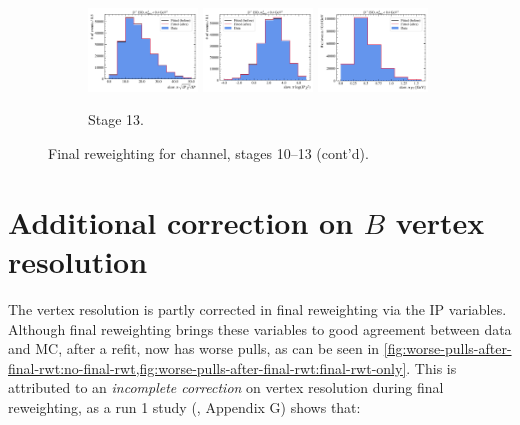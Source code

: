 \begin{figure}[htb]
    \begin{subfigure}{\textwidth}
        \centering
        \includegraphics[width=0.32\textwidth]{./figs-mc-correction/reweighting-final/plot_step12-Dst_iso-spi_comp.pdf}
        \includegraphics[width=0.32\textwidth]{./figs-mc-correction/reweighting-final/plot_step12-Dst_iso-spi_log_ip_chi2.pdf}
        \includegraphics[width=0.32\textwidth]{./figs-mc-correction/reweighting-final/plot_step12-Dst_iso-spi_pt.pdf}
        \caption{Stage 13.}
    \end{subfigure}

    \caption{Final reweighting for \Dstar channel, stages 10--13 (cont'd).}
    \label{fig:final-rwt-dst-idx3}
\end{figure}


\section{Additional correction on $B$ vertex resolution}
\label{ref:mc-cor:vertex}

The \B vertex resolution is partly corrected in final reweighting via the IP
variables.
Although final reweighting brings these variables to good agreement
between data and MC, after a refit, \mmSq now has worse pulls, as can be seen
in \cref{fig:worse-pulls-after-final-rwt:no-final-rwt,fig:worse-pulls-after-final-rwt:final-rwt-only}.
This is attributed to an \emph{incomplete correction} on vertex resolution
during final reweighting,
as a run 1 study (\cite{LHCb-ANA-2020-056}, Appendix G) shows that:

